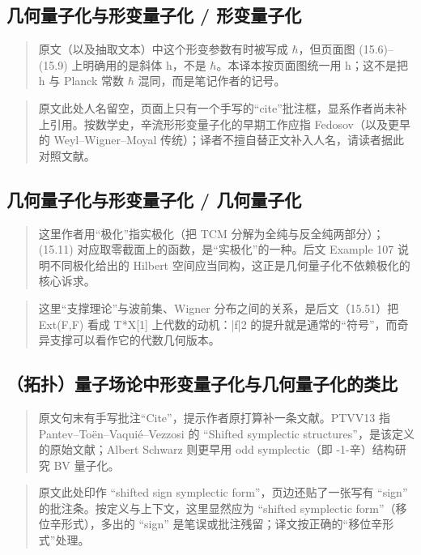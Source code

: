 \subsection*{几何量子化与形变量子化 / 形变量子化}
\begin{quote}\small
原文（以及抽取文本）中这个形变参数有时被写成 $\hbar$，但页面图 (15.6)--(15.9) 上明确用的是斜体 h，不是 $\hbar$。本译本按页面图统一用 h；这不是把 h 与 Planck 常数 $\hbar$ 混同，而是笔记作者的记号。
\end{quote}

\begin{quote}\small
原文此处人名留空，页面上只有一个手写的“cite”批注框，显系作者尚未补上引用。按数学史，辛流形形变量子化的早期工作应指 Fedosov（以及更早的 Weyl--Wigner--Moyal 传统）；译者不擅自替正文补入人名，请读者据此对照文献。
\end{quote}

\subsection*{几何量子化与形变量子化 / 几何量子化}
\begin{quote}\small
这里作者用“极化”指实极化（把 TCM 分解为全纯与反全纯两部分）；(15.11) 对应取零截面上的函数，是“实极化”的一种。后文 Example 107 说明不同极化给出的 Hilbert 空间应当同构，这正是几何量子化不依赖极化的核心诉求。
\end{quote}

\begin{quote}\small
这里“支撑理论”与波前集、Wigner 分布之间的关系，是后文（15.51）把 Ext(F,F) 看成 T*X[1] 上代数的动机：|f|2 的提升就是通常的“符号”，而奇异支撑可以看作它的代数几何版本。
\end{quote}

\subsection*{（拓扑）量子场论中形变量子化与几何量子化的类比}
\begin{quote}\small
原文句末有手写批注“Cite”，提示作者原打算补一条文献。PTVV13 指 Pantev--Toën--Vaquié--Vezzosi 的 “Shifted symplectic structures”，是该定义的原始文献；Albert Schwarz 则更早用 odd symplectic（即 -1-辛）结构研究 BV 量子化。
\end{quote}

\begin{quote}\small
原文此处印作 “shifted sign symplectic form”，页边还贴了一张写有 “sign” 的批注条。按定义与上下文，这里显然应为 “shifted symplectic form”（移位辛形式），多出的 “sign” 是笔误或批注残留；译文按正确的“移位辛形式”处理。
\end{quote}

